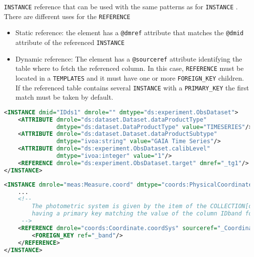 \texttt{INSTANCE} reference that can be used with the same patterns as for \texttt{INSTANCE} .
There are different uses for the \texttt{REFERENCE} 

\begin{itemize}
    \item Static reference: the element has a \texttt{@dmref} attribute that matches the \texttt{@dmid} attribute of the referenced \texttt{INSTANCE} 
    \item Dynamic reference: The element has a \texttt{@sourceref} attribute identifying  the table where to fetch the referenced column.   
             In this case, \texttt{REFERENCE} must be located in a \texttt{TEMPLATES} and it must have one or more \texttt{FOREIGN\_KEY} children. 
             If the referenced table contains several \texttt{INSTANCE} with a \texttt{PRIMARY\_KEY}  the first match must be taken by default.
\end{itemize}

\begin{lstlisting}[caption={Simple \texttt{REFERENCE}, to be replaced with the \texttt{INSTANCE} having \texttt{@dmid=\_tg1} (see line~\ref{REFERENCE_snippet_1} in Appendix~\ref{appendix_A}).},language=XML]
<INSTANCE dmid="IDds1" dmrole="" dmtype="ds:experiment.ObsDataset">
    <ATTRIBUTE dmrole="ds:dataset.Dataset.dataProductType" 
               dmtype="ds:dataset.DataProductType" value="TIMESERIES"/>
    <ATTRIBUTE dmrole="ds:dataset.Dataset.dataProductSubtype" 
               dmtype="ivoa:string" value="GAIA Time Series"/>
    <ATTRIBUTE dmrole="ds:experiment.ObsDataset.calibLevel" 
               dmtype="ivoa:integer" value="1"/>
    <REFERENCE dmrole="ds:experiment.ObsDataset.target" dmref="_tg1"/>
</INSTANCE>

\end{lstlisting}

\begin{lstlisting}[caption={Dynamic \texttt{REFERENCE}, 
                            to be replaced with the \texttt{INSTANCE} of the table of collection \texttt{\_CoordinateSystems} 
                            and having a \texttt{PRIMARY\_KEY} matching the value of the column  \texttt{\_band}.
                            This pattern is valid in the context of a TEMPLATES
                            (see line~\ref{REFERENCE_snippet_2}).},language=XML]
<INSTANCE dmrole="meas:Measure.coord" dmtype="coords:PhysicalCoordinate">
    ...
    <!--
        The photometric system is given by the item of the COLLECTION[dmid=IDCoordinateSystems]
        having a primary key matching the value of the column IDband for that particular row
     -->
    <REFERENCE dmrole="coords:Coordinate.coordSys" sourceref="_CoordinateSystems">
        <FOREIGN_KEY ref="_band"/>
    </REFERENCE>
</INSTANCE>
\end{lstlisting}

